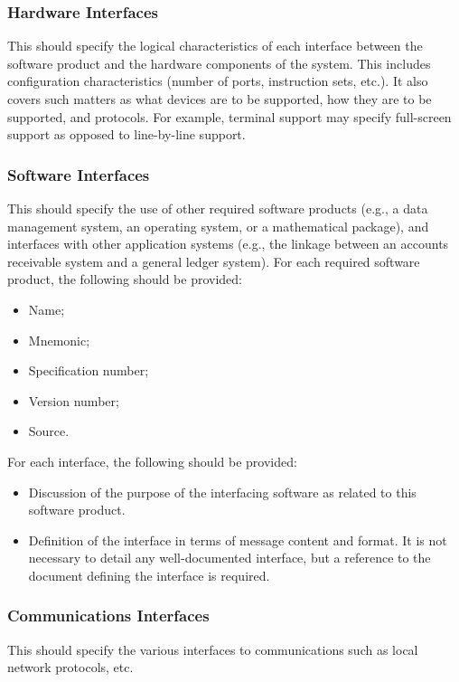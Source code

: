 \documentclass[draftclsnofoot,onecolumn,10pt]{IEEEtran}
\begin{document}
\subsubsection{Hardware Interfaces} %

This should specify the logical characteristics of each interface between the
software product and the hardware components of the system. This includes
configuration characteristics (number of ports, instruction sets, etc.). It also
covers such matters as what devices are to be supported, how they are to be
supported, and protocols. For example, terminal support may specify full-screen
support as opposed to line-by-line support.


\subsubsection{Software Interfaces} %
This should specify the use of other required software products (e.g., a data
management system, an operating system, or a mathematical package), and
interfaces with other application systems (e.g., the linkage between an accounts
receivable system and a general ledger system). For each required software
product, the following should be provided:
\begin{itemize}
	\item Name;
	\item Mnemonic;
	\item Specification number;
	\item Version number;
	\item Source.
\end{itemize}


For each interface, the following should be provided:

\begin{itemize}
	\item Discussion of the purpose of the interfacing software as related to
		this software product.
	\item Definition of the interface in terms of message content and format. It
		is not necessary to detail any well-documented interface, but a
		reference to the document defining the interface is required.
\end{itemize}

\subsubsection{Communications Interfaces} %
This should specify the various interfaces to communications such as local
network protocols, etc.
\end{document}
